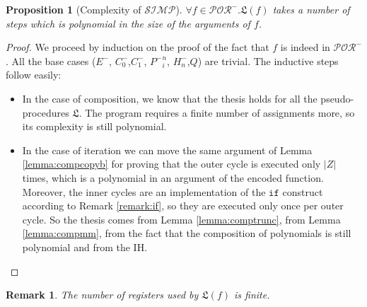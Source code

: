 \documentclass[10pt]{amsart}
\newcommand{\POR}{\mathcal{POR}}
\newcommand{\SIMP}{\mathcal{SIMP}}
\newcommand{\If}{\mathtt{if}}
\newcommand{\LL}{\mathfrak L}
\newtheorem{prop}{Proposition}
\newtheorem{remark}{Remark}
\begin{document}
\begin{prop}[Complexity of $\SIMP$]
$\forall f \in \POR^-. \LL(f)$ takes a number of steps which is polynomial in the size of the arguments of $f$.
\end{prop}
\begin{proof}
We proceed by induction on the proof of the fact that $f$ is indeed in $\POR^-$. All the base cases ($E^-$, $C_0^-$,$C_1^-$, ${P^-}^n_i$, $H^-_n$,$Q$) are trivial. The inductive steps follow easily:
\begin{itemize}
\item In the case of composition, we know that the thesis holds for all the pseudo-procedures $\LL$. The program requires a finite number of assignments more, so its complexity is still polynomial.
\item In the case of iteration we can move the same argument of Lemma \ref{lemma:compcopyb} for proving that the outer cycle is executed only $|Z|$ times, which is a polynomial in an argument of the encoded function. Moreover, the inner cycles are an implementation of the $\If$ construct according to Remark \ref{remark:if}, so they are executed only once per outer cycle. So the thesis comes from Lemma \ref{lemma:comptrunc}, from Lemma \ref{lemma:compmm}, from the fact that the composition of polynomials is still polynomial and from the IH.
\end{itemize}
\end{proof}

\begin{remark}
The number of registers used by $\LL(f)$ is finite.
\end{remark}
\end{document}
